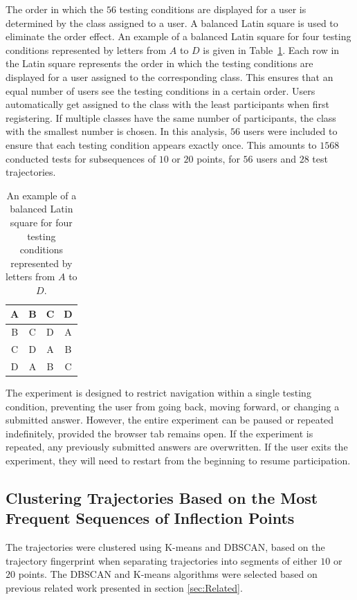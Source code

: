 \documentclass[preprint,12pt]{elsarticle}
\begin{document}
The order in which the $56$ testing conditions are displayed for a user is determined by the class assigned to a user. A balanced Latin square is used to eliminate the order effect. An example of a balanced Latin square for four testing conditions represented by letters from $A$ to $D$ is given in Table~\ref{tab:latin}. Each row in the Latin square represents the order in which the testing conditions are displayed for a user assigned to the corresponding class. This ensures that an equal number of users see the testing conditions in a certain order. Users automatically get assigned to the class with the least participants when first registering. If multiple classes have the same number of participants, the class with the smallest number is chosen. In this analysis, $56$ users were included to ensure that each testing condition appears exactly once. This amounts to $1568$ conducted tests for subsequences of $10$ or $20$ points, for $56$ users and $28$ test trajectories.

\begin{table}[!ht]
    \centering
    \begin{tabular}{|c|c|c|c|}
        \hline
        A & B & C & D \\ \hline
        B & C & D & A \\ \hline
        C & D & A & B \\ \hline
        D & A & B & C \\ \hline
    \end{tabular}
    \caption{An example of a balanced Latin square for four testing conditions represented by letters from $A$ to $D$.}
    \label{tab:latin}
\end{table}

The experiment is designed to restrict navigation within a single testing condition, preventing the user from going back, moving forward, or changing a submitted answer. However, the entire experiment can be paused or repeated indefinitely, provided the browser tab remains open. If the experiment is repeated, any previously submitted answers are overwritten. If the user exits the experiment, they will need to restart from the beginning to resume participation.

\subsection{Clustering Trajectories Based on the Most Frequent Sequences of Inflection Points}

The trajectories were clustered using K-means and DBSCAN, based on the trajectory fingerprint when separating trajectories into segments of either $10$ or $20$ points. The DBSCAN and K-means algorithms were selected based on previous related work presented in section \ref{sec:Related}.
\end{document}
